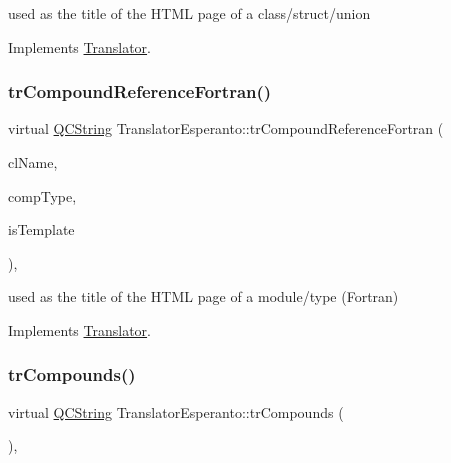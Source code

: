 used as the title of the H\+T\+ML page of a class/struct/union 

Implements \mbox{\hyperlink{class_translator}{Translator}}.

\mbox{\label{class_translator_esperanto_a6d0ca79459de357dafb2a7aa587e948d}} 
\subsubsection{\texorpdfstring{trCompoundReferenceFortran()}{trCompoundReferenceFortran()}}
{\footnotesize\ttfamily virtual \mbox{\hyperlink{class_q_c_string}{Q\+C\+String}} Translator\+Esperanto\+::tr\+Compound\+Reference\+Fortran (\begin{DoxyParamCaption}\item[{const char $\ast$}]{cl\+Name,  }\item[{\mbox{\hyperlink{class_class_def_ae70cf86d35fe954a94c566fbcfc87939}{Class\+Def\+::\+Compound\+Type}}}]{comp\+Type,  }\item[{bool}]{is\+Template }\end{DoxyParamCaption})\hspace{0.3cm}{\ttfamily [inline]}, {\ttfamily [virtual]}}

used as the title of the H\+T\+ML page of a module/type (Fortran) 

Implements \mbox{\hyperlink{class_translator}{Translator}}.

\mbox{\label{class_translator_esperanto_a22a4810210f05b5ac3e7c9fcb16b998a}} 
\subsubsection{\texorpdfstring{trCompounds()}{trCompounds()}}
{\footnotesize\ttfamily virtual \mbox{\hyperlink{class_q_c_string}{Q\+C\+String}} Translator\+Esperanto\+::tr\+Compounds (\begin{DoxyParamCaption}{ }\end{DoxyParamCaption})\hspace{0.3cm}{\ttfamily [inline]}, {\ttfamily [virtual]}}

